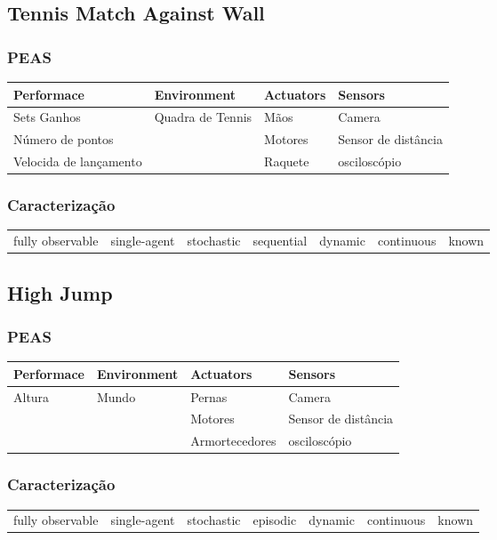 \documentclass[a4paper,12pt]{article}
\begin{document}
\subsection{Tennis Match Against Wall}
\subsubsection{PEAS}
\begin{table}[h!]
\begin{tabular}{l|l|l|l}
\hline
Performace & Environment & Actuators & Sensors \\
\hline
Sets Ganhos & Quadra de Tennis & Mãos & Camera \\
Número de pontos & & Motores & Sensor de distância\\
Velocida de lançamento & & Raquete & osciloscópio\\
\end{tabular}
\end{table}
\subsubsection{Caracterização}
\begin{table}[h!]
\begin{tabular}{|c|c|c|c|c|c|c|}
\hline
fully observable & single-agent & stochastic & sequential & dynamic & continuous & known
\end{tabular}
\end{table}

\subsection{High Jump}
\subsubsection{PEAS}
\begin{table}[h!]
\begin{tabular}{l|l|l|l}
\hline
Performace & Environment & Actuators & Sensors \\
\hline
Altura & Mundo & Pernas & Camera \\
 & & Motores & Sensor de distância\\
 & & Armortecedores & osciloscópio\\
\end{tabular}
\end{table}
\subsubsection{Caracterização}
\begin{table}[h!]
\begin{tabular}{|c|c|c|c|c|c|c|}
\hline
fully observable & single-agent & stochastic & episodic & dynamic & continuous & known
\end{tabular}
\end{table}
\end{document}
